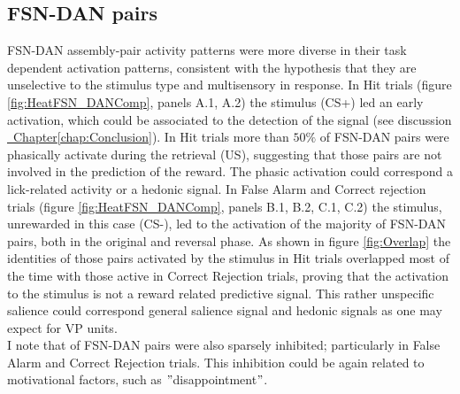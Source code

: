 \subsection{FSN-DAN pairs}
FSN-DAN assembly-pair activity patterns were more diverse in their task dependent activation patterns, consistent with the hypothesis that they are unselective to the stimulus type and multisensory in response. In Hit trials (figure \ref{fig:HeatFSN_DANComp}, panels A.1, A.2) the stimulus (CS+) led an early activation, which could be associated to the detection of the signal (see discussion \hyperref[chap:Conclusion]{~Chapter\ref*{chap:Conclusion}}). In Hit trials more than $50\%$ of FSN-DAN pairs were phasically activate during the retrieval (US), suggesting that those pairs are not involved in the prediction of the reward. The phasic activation could correspond a lick-related activity or a hedonic signal. In False Alarm and Correct rejection trials (figure \ref{fig:HeatFSN_DANComp}, panels B.1, B.2, C.1, C.2) the stimulus, unrewarded in this case (CS-), led to the activation of the majority of FSN-DAN pairs, both in the original and reversal phase. As shown in figure \ref{fig:Overlap} the identities of those pairs activated by the stimulus in Hit trials overlapped most of the time with those active in Correct Rejection trials, proving that the activation to the stimulus is not a reward related predictive signal. This rather unspecific salience could correspond general salience signal and hedonic signals as one may expect for VP units.\\I note that of FSN-DAN pairs were also sparsely inhibited; particularly in False Alarm and Correct Rejection trials. This inhibition could be again related to motivational factors, such as $"$disappointment$"$. 
